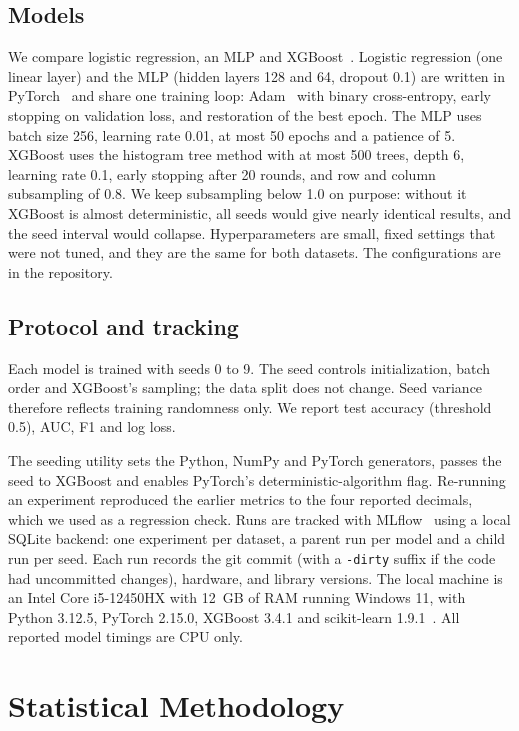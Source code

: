 \documentclass[conference]{IEEEtran}
\begin{document}
\subsection{Models}
We compare logistic regression, an MLP and XGBoost~\cite{chen2016}. Logistic regression (one linear layer) and the MLP (hidden layers 128 and 64, dropout 0.1) are written in PyTorch~\cite{paszke2019} and share one training loop: Adam~\cite{kingma2015} with binary cross-entropy, early stopping on validation loss, and restoration of the best epoch. The MLP uses batch size 256, learning rate 0.01, at most 50 epochs and a patience of 5. XGBoost uses the histogram tree method with at most 500 trees, depth 6, learning rate 0.1, early stopping after 20 rounds, and row and column subsampling of 0.8. We keep subsampling below 1.0 on purpose: without it XGBoost is almost deterministic, all seeds would give nearly identical results, and the seed interval would collapse. Hyperparameters are small, fixed settings that were not tuned, and they are the same for both datasets. The configurations are in the repository.

\subsection{Protocol and tracking}
Each model is trained with seeds 0 to 9. The seed controls initialization, batch order and XGBoost's sampling; the data split does not change. Seed variance therefore reflects training randomness only. We report test accuracy (threshold 0.5), AUC, F1 and log loss.

The seeding utility sets the Python, NumPy and PyTorch generators, passes the seed to XGBoost and enables PyTorch's deterministic-algorithm flag. Re-running an experiment reproduced the earlier metrics to the four reported decimals, which we used as a regression check. Runs are tracked with MLflow~\cite{zaharia2018} using a local SQLite backend: one experiment per dataset, a parent run per model and a child run per seed. Each run records the git commit (with a \texttt{-dirty} suffix if the code had uncommitted changes), hardware, and library versions. The local machine is an Intel Core i5-12450HX with 12~GB of RAM running Windows 11, with Python 3.12.5, PyTorch 2.15.0, XGBoost 3.4.1 and scikit-learn 1.9.1~\cite{pedregosa2011}. All reported model timings are CPU only.

\section{Statistical Methodology}
\label{sec:stats}
\end{document}
